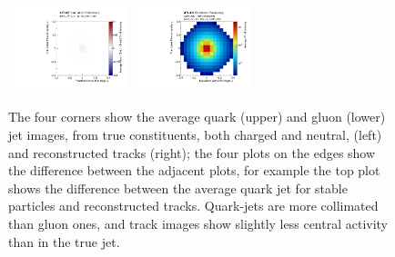 \begin{figure}[h!]
\begin{center}
\includegraphics[width=0.31\textwidth]{figures/CNN/diff_gluon_truth_track.pdf}
\includegraphics[width=0.31\textwidth]{figures/CNN/gluon_track.pdf}
\caption{The four corners show the average quark (upper) and gluon (lower) jet images, from true constituents, both charged and neutral, (left) and reconstructed tracks (right); the four plots on the edges show the difference between the adjacent plots, for example the top plot shows the difference between the average quark jet for stable particles and reconstructed tracks. Quark-jets are more collimated than gluon ones, and track images show slightly less central activity than in the true jet.}
\label{fig:cnn-avg:truthtrack}
\end{center}
\end{figure}

